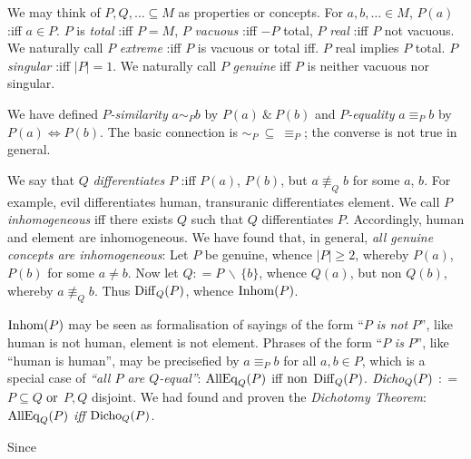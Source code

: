 \documentclass[bsl,meeting]{asl}
\newcommand{\NP}{}
\begin{document}
\thispagestyle{empty}
\NP  
{}
\par 
We may think of 
$ P , Q , \ldots \subseteq M $
as properties or concepts. 
For 
$ a , b , \ldots \in M $, 
$ P ( a ) $ 
:iff 
$ a \in P $. 
$ P $ 
is 
{\it total} 
:iff 
$ P = M $, 
$ P $ 
{\it vacuous} 
:iff 
$ - P $
total,
$ P $ 
{\it real} 
:iff 
$ P $ 
not vacuous. 
We naturally call 
$ P $ 
{\it extreme}
:iff
$ P $ 
is 
vacuous 
or
total
iff. 
$ P $ 
real 
implies
$ P $ 
total.  
$ P $ 
{\it singular} 
:iff 
$ | P | = 1 $.
We 
naturally call 
$ P $ 
{\it genuine} 
iff 
$ P $ 
is neither 
vacuous 
nor
singular. 
\par 
We have defined
$ P ${\em -similarity} 
$ a \sim _P b $
by
$ P ( a ) \  \& \  P ( b ) $
and 
$ P ${\em -equality} 
$ a \equiv_P b $
by 
$ P ( a ) \Leftrightarrow P ( b ) $.
The basic connection is 
$ \sim _P \  \subseteq \  \equiv _P $; 
the converse is not true in general. 
\par
We say that 
$ Q $ 
{\it differentiates} 
$ P $ 
:iff 
$ P ( a ) $, 
$ P ( b ) $, 
but
$ a \not\equiv _Q b $
for some 
$ a $, 
$ b $.  
For example, 
evil differentiates human, 
transuranic differentiates element. 
We call 
$ P $ 
{\it inhomogeneous}
iff 
there exists
$ Q $ 
such that 
$ Q $ 
differentiates 
$ P $. 
Accordingly, 
human
and 
element 
are inhomogeneous. 
We have found that, 
in general, 
{\it all genuine concepts are inhomogeneous}:
Let 
$ P $ 
be genuine,
whence 
$ | P | \geq 2 $, 
whereby 
$ P ( a ) $, 
$ P ( b ) $
for some
$ a \neq b $.
Now let 
$ Q : = P \, \backslash \, \{ b \} $, 
whence
$ Q ( a ) $, 
but 
non 
$ Q ( b ) $, 
whereby 
$ a \not\equiv _Q b $. 
Thus
$ {\rm Diff} _Q (P) $, 
whence 
$ {\rm Inhom} ( P ) $. 
\par 
$ {\rm Inhom} ( P ) $
may be seen as formalisation of sayings of the form
``$ P $ {\it is not} $ P $'',
like human is not human, 
element is not element. 
Phrases of the form 
``$ P $ {\it is} $ P $'',
like 
``human is human'',
may be precisefied by 
$ a \equiv _P b $
for all 
$ a , b \in P $,
which is a special case 
of 
{\it ``all $ P $ are $ Q $-equal''}: 
$ {\rm AllEq} _Q (P) $
iff
$ {\rm non} $
$ {\rm Diff} _Q ( P ) $. 
$ {\it Dicho} _Q ( P ) $
$ : =  $
$ P \subseteq Q $
$ {\rm or} $
$ P , Q $
disjoint. 
We had found and proven 
the 
{\it Dichotomy Theorem}: 
$ {\rm AllEq} _Q (P) $ 
{\it iff}
$ {\rm Dicho} _Q ( P ) $. 
\par
Since 
\end{document}
